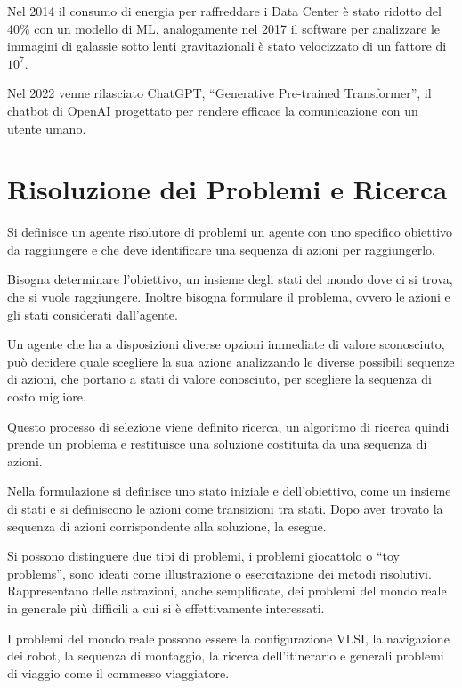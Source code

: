 \documentclass{article}
\numberwithin{equation}{subsection}
\begin{document}
Nel 2014 il consumo di energia per raffreddare i Data Center è stato ridotto del 40\% con un modello 
di ML, analogamente nel 2017 il software per analizzare le immagini di galassie sotto lenti 
gravitazionali è stato velocizzato di un fattore di $10^7$.  

Nel 2022 venne rilasciato ChatGPT, ``Generative Pre-trained Transformer'', il chatbot di OpenAI 
progettato per rendere efficace la comunicazione con un utente umano. 

\clearpage

\section{Risoluzione dei Problemi e Ricerca}

Si definisce un agente risolutore di problemi un agente con uno specifico obiettivo da 
raggiungere e che deve identificare una sequenza di azioni per raggiungerlo. 

Bisogna determinare l'obiettivo, un insieme degli stati del mondo dove ci si trova, che 
si vuole raggiungere. 
Inoltre bisogna formulare il problema, ovvero le azioni e gli stati considerati 
dall'agente. 


Un agente che ha a disposizioni diverse opzioni immediate di valore sconosciuto, può decidere 
quale scegliere la sua azione analizzando le diverse possibili sequenze di azioni, che portano 
a stati di valore conosciuto, per scegliere la sequenza di costo migliore. 

Questo processo di selezione viene definito ricerca, un algoritmo di ricerca quindi  
prende un problema e restituisce una soluzione costituita da una sequenza di azioni. 

Nella formulazione si definisce uno stato iniziale e dell'obiettivo, come un insieme di stati 
e si definiscono le azioni come transizioni tra stati. Dopo aver trovato la sequenza di azioni 
corrispondente alla soluzione, la esegue. 


Si possono distinguere due tipi di problemi, i problemi giocattolo o ``toy problems'', sono 
ideati come illustrazione o esercitazione dei metodi risolutivi. Rappresentano delle 
astrazioni, anche semplificate, dei problemi del mondo reale in generale più difficili a cui 
si è effettivamente interessati. 

I problemi del mondo reale possono essere la configurazione VLSI, la navigazione dei robot, 
la sequenza di montaggio, la ricerca dell'itinerario e generali problemi di viaggio come il 
commesso viaggiatore. 
\end{document}
